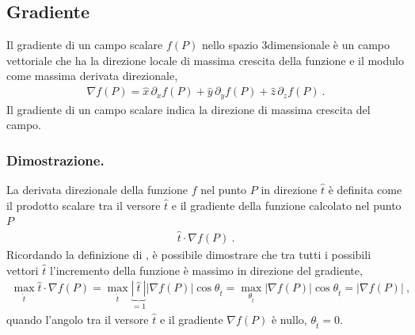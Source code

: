 \documentclass[letterpaper,10pt,italian]{jupyterBook}
\begin{document}
\subsection{Gradiente}
\label{\detokenize{ch/vector-calculus/derivatives:gradiente}}\label{\detokenize{ch/vector-calculus/derivatives:vector-calculus-derivatives-gradient}}
\sphinxAtStartPar
{} Il gradiente di un campo scalare \(f(P)\) nello spazio 3\sphinxhyphen{}dimensionale è un campo vettoriale che ha la direzione locale di massima crescita della funzione e il modulo come massima derivata direzionale,
\begin{equation*}
\begin{split}\nabla f(P) = \hat{x} \, \partial_x f(P) + \hat{y} \, \partial_y f(P) + \hat{z} \, \partial_z f(P) \ . \end{split}
\end{equation*}
\sphinxAtStartPar
{} Il gradiente di un campo scalare indica la direzione  di massima crescita del campo.
\subsubsection*{Dimostrazione.}

\sphinxAtStartPar
La derivata direzionale della funzione \(f\) nel punto \(P\) in direzione \(\hat{t}\) è definita come il prodotto scalare tra il versore \(\hat{t}\) e il gradiente della funzione calcolato nel punto \(P\)
\begin{equation*}
\begin{split}\hat{t} \cdot \nabla f(P) \ .\end{split}
\end{equation*}
\sphinxAtStartPar
Ricordando la definizione di {\hyperref[\detokenize{ch/algebra/vector-algebra-euclidean-space:math-hs-algebra-vector-euclidean-space-inner-product}]{}}, è possibile dimostrare che tra tutti i possibili vettori \(\hat{t}\) l’incremento della funzione è massimo in direzione del gradiente,
\begin{equation*}
\begin{split}\max_{\hat{t}} \hat{t} \cdot \nabla f(P) = \max_{\hat{t}} \underbrace{|\ \hat{t} \ |}_{=1} |\nabla f(P)| \cos \theta_{\hat{t}} = \max_{\theta_{\hat{t}}} |\nabla f(P)| \cos \theta_{\hat{t}} = |\nabla f(P)| \ ,\end{split}
\end{equation*}
\sphinxAtStartPar
quando l’angolo tra il versore \(\hat{t}\) e il gradiente \(\nabla f(P)\) è nullo, \(\theta_{\hat{t}} = 0\).
\end{document}
